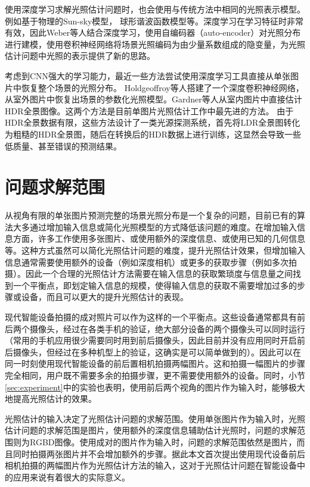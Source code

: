 使用深度学习求解光照估计问题时，也会使用与传统方法中相同的光照表示模型。例如基于物理的Sun-sky模型\cite{hold2017deep}， 球形谐波函数模型\cite{mandl2017learning}等。深度学习在学习特征时非常有效，因此Weber等人\cite{weber2018learning}结合深度学习，使用自编码器（auto-encoder）对光照分布进行建模，使用卷积神经网络将场景光照编码为由少量系数组成的隐变量，为光照估计问题中光照的表示提供了新的思路。

考虑到CNN强大的学习能力，最近一些方法尝试使用深度学习工具直接从单张图片中恢复整个场景的光照分布。
Holdgeoffroy等人\cite{hold2017deep}搭建了一个深度卷积神经网络，从室外图片中恢复出场景的参数化光照模型。Gardner等人\cite{gardner2017learning}从室内图片中直接估计HDR全景图像。这两个方法是目前单图片光照估计工作中最先进的方法。
由于HDR全景数据有限，这些方法设计了一类光源探测系统，首先将LDR全景图转化为粗糙的HDR全景图，随后在转换后的HDR数据上进行训练，这显然会导致一些低质量、甚至错误的预测结果。

\section{问题求解范围}
从视角有限的单张图片预测完整的场景光照分布是一个复杂的问题，目前已有的算法大多通过增加输入信息或简化光照模型的方式降低该问题的难度。在增加输入信息方面，许多工作使用多张图片、或使用额外的深度信息、或使用已知的几何信息等。这种方式虽然可以简化光照估计问题的难度，提升光照估计效果，但增加输入信息通常需要使用额外的设备（例如深度相机）或更多的获取步骤（例如多次拍摄）。因此一个合理的光照估计方法需要在输入信息的获取繁琐度与信息量之间找到一个平衡点，即划定输入信息的规模，使得输入信息的获取不需要增加过多的步骤或设备，而且可以更大的提升光照估计的表现。

现代智能设备拍摄的成对照片可以作为这样的一个平衡点。这些设备通常都具有前后两个摄像头，经过在各类手机的验证，绝大部分设备的两个摄像头可以同时运行（常用的手机应用很少需要同时用到前后摄像头，因此目前并没有应用同时开启前后摄像头，但经过在多种机型上的验证，这确实是可以简单做到的）。因此可以在同一时刻使用现代智能设备的前后置相机拍摄两幅图片。这和拍摄一幅图片的步骤完全相同，用户既不需要多余的拍摄步骤，更不需要使用额外的设备。同时，小节\ref{sec:experiment}中的实验也表明，使用前后两个视角的图片作为输入时，能够极大地提高光照估计的效果。

光照估计的输入决定了光照估计问题的求解范围。使用单张图片作为输入时，光照估计问题的求解范围是图片，使用额外的深度信息辅助估计光照时，问题的求解范围则为RGBD图像。使用成对的图片作为输入时，问题的求解范围依然是图片，而且同时拍摄两张图片并不会增加额外的步骤。据此本文首次提出使用现代设备前后相机拍摄的两幅图片作为光照估计方法的输入，这对于光照估计问题在智能设备中的应用来说有着很大的实际意义。

